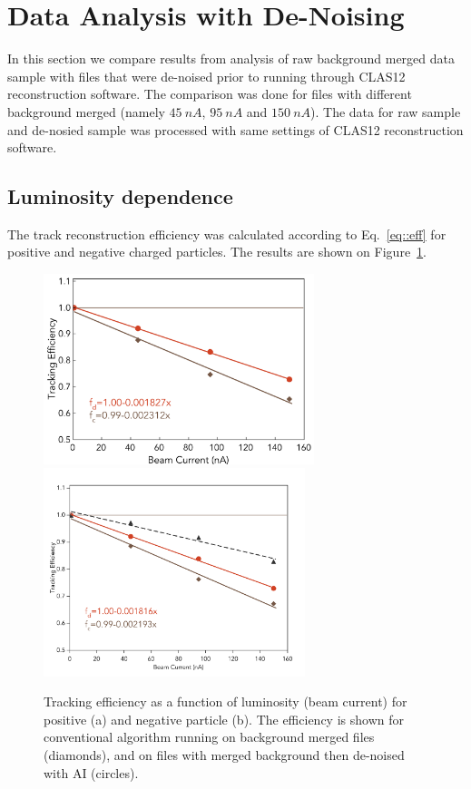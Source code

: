 \section{Data Analysis with De-Noising}

In this section we compare results from analysis of raw background merged data sample with files that were de-noised prior to running through CLAS12 reconstruction software. The comparison was done for files with different background merged (namely $45~nA$, $95~nA$ and $150~nA$). The data for raw sample and de-nosied sample was processed with same settings of CLAS12 reconstruction software.

\subsection{Luminosity dependence}

The track reconstruction efficiency was calculated according to Eq.~\ref{eq::eff} for positive and negative charged particles. The results are shown on Figure~\ref{lscan::conv_dn}. 

\begin{figure}[!h]
\begin{center}
 \includegraphics[width=3.1in]{images/figure_lscan_pos.pdf}
 \includegraphics[width=3in]{images/figure_lscan_neg.pdf}
\caption {Tracking efficiency as a function of luminosity (beam current) for positive (a) and negative particle (b).  The efficiency is shown for
conventional algorithm running on background merged files (diamonds), and on files with merged background then de-noised with AI (circles).}
 \label{lscan::conv_dn}
 \end{center}
\end{figure}

